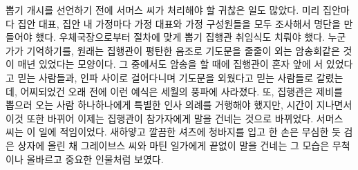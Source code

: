 \documentclass{translation}
\begin{document}
뽑기 개시를 선언하기 전에 서머스 씨가 처리해야 할 귀찮은 일도 많았다.
미리 집안마다 집안 대표, 집안 내 가정마다 가정 대표와 가정 구성원들을 모두 조사해서 명단을 만들어야 했다.
우체국장으로부터 절차에 맞게 뽑기 집행관 취임식도 치뤄야 했다.
누군가가 기억하기를, 원래는 집행관이 평탄한 음조로 기도문을 줄줄이 외는 암송회같은 것이 매년 있었다는 모양이다.
그 중에서도 암송을 할 때에 집행관이 혼자 앞에 서 있었다고 믿는 사람들과, 인파 사이로 걸어다니며 기도문을 외웠다고 믿는 사람들로 갈렸는데, 어찌되었건 오래 전에 이런 예식은 세월의 풍파에 사라졌다. 
또, 집행관은 제비를 뽑으러 오는 사람 하나하나에게 특별한 인사 의례를 거행해야 했지만, 시간이 지나면서 이것 또한 바뀌어 이제는 집행관이 참가자에게 말을 건네는 것으로 바뀌었다.
서머스 씨는 이 일에 적임이었다.
새하얗고 깔끔한 셔츠에 청바지를 입고 한 손은 무심한 듯 검은 상자에 올린 채 그레이브스 씨와 마틴 일가에게 끝없이 말을 건네는 그 모습은 무척이나 올바르고 중요한 인물처럼 보였다.
% 
\end{document}
